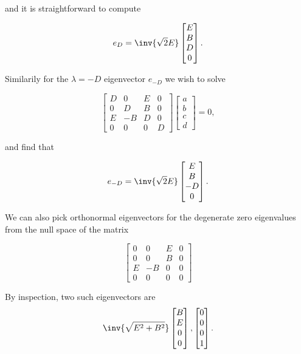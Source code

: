 and it is straightforward to compute

\begin{equation}\label{eqn:relElectroDynProblemSet2:610}
e_D = 
\inv{\sqrt{2}E}
\begin{bmatrix} 
E \\
B \\
D \\
0
\end{bmatrix}.
\end{equation}

Similarily for the $\lambda = -D$ eigenvector $e_{-D}$ we wish to solve

\begin{equation}\label{eqn:relElectroDynProblemSet2:630}
\begin{bmatrix}
D & 0 & E & 0 \\
0 & D & B & 0 \\
E & -B & D & 0 \\
0 & 0 & 0 & D
\end{bmatrix} 
\begin{bmatrix} 
a \\
b \\
c \\
d
\end{bmatrix} 
 = 0,
\end{equation}

and find that

\begin{equation}\label{eqn:relElectroDynProblemSet2:650}
e_{-D} = 
\inv{\sqrt{2}E}
\begin{bmatrix} 
E \\
B \\
-D \\
0
\end{bmatrix}.
\end{equation}

We can also pick orthonormal eigenvectors for the degenerate zero eigenvalues from the null space of the matrix

\begin{equation}\label{eqn:relElectroDynProblemSet2:670}
\begin{bmatrix}
0 & 0 & E & 0 \\
0 & 0 & B & 0 \\
E & -B & 0 & 0 \\
0 & 0 & 0 & 0
\end{bmatrix} 
\end{equation}

By inspection, two such eigenvectors are 
\begin{equation}\label{eqn:relElectroDynProblemSet2:690}
\inv{\sqrt{E^2 + B^2}}
\begin{bmatrix} 
B \\
E \\
0 \\
0 
\end{bmatrix},
\begin{bmatrix} 
0 \\
0 \\
0 \\
1 
\end{bmatrix}.
\end{equation}

